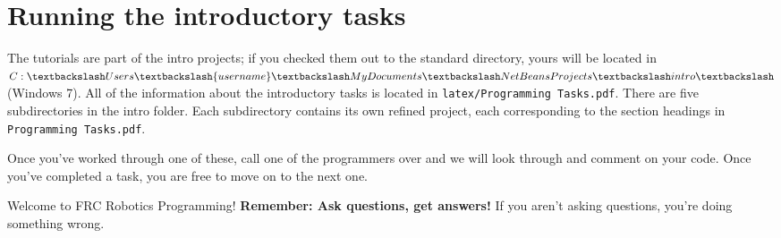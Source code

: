 \documentclass[a4paper]{article}
\begin{document}
\section{Running the introductory tasks}

The tutorials are part of the intro projects; if you checked them out to the standard directory, yours will be located in $C:\textbackslash Users\textbackslash\{username\}\textbackslash My Documents\textbackslash NetBeansProjects\textbackslash intro\textbackslash$ (Windows 7). All of the information about the introductory tasks is located in \lstinline{latex/Programming Tasks.pdf}. There are five subdirectories in the intro folder. Each subdirectory contains its own refined project, each corresponding to the section headings in \lstinline{Programming Tasks.pdf}. 

Once you've worked through one of these, call one of the programmers over and we will look through and comment on your code. Once you've completed a task, you are free to move on to the next one. 

Welcome to FRC Robotics Programming! \textbf{Remember: Ask questions, get answers!} If you aren't asking questions, you're doing something wrong.
\end{document}
